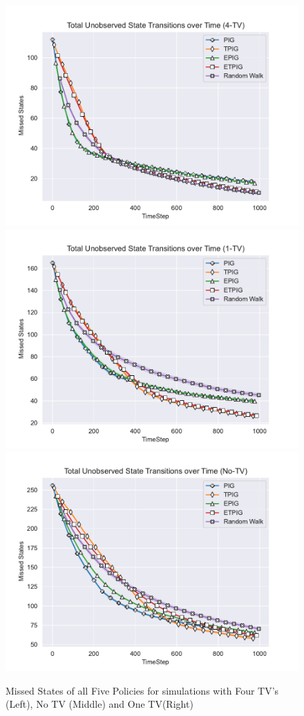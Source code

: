 \documentclass[12pt]{thesis}
\begin{document}
\begin{figure}
	\begin{center}
		\includegraphics[scale=0.7]{"images/Missed_States_4-TV.pdf"}
		\includegraphics[scale=0.7]{"images/Missed_States_1-TV.pdf"}
		\includegraphics[scale=0.7]{"images/Missed_States_No-TV.pdf"}
	\end{center}
	\caption{Missed States of all Five Policies for simulations with Four TV's (Left), No TV (Middle) and One TV(Right)}
	\label{Fig:MSFP}
\end{figure}
\end{document}
